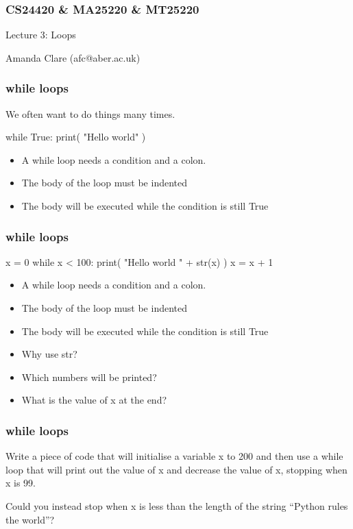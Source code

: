 \documentclass{beamer}
\begin{document}

\begin{frame}
\frametitle{CS24420 \& MA25220 \& MT25220}

\begin{center}
\begin{huge}
Lecture 3: Loops
\end{huge}
\bigskip

Amanda Clare (afc@aber.ac.uk)

\end{center}
\end{frame}


\begin{frame}[fragile]
\frametitle{while loops}
We often want to do things many times.
\begin{code}
while True:
   print( "Hello world" )
\end{code}
\begin{itemize}
\item A while loop needs a condition and a colon.
\item The body of the loop must be indented
\item The body will be executed while the condition is still True
\end{itemize}
\end{frame}


\begin{frame}[fragile]
\frametitle{while loops}
\begin{code}
x = 0
while x < 100:
   print( "Hello world " + str(x) )
   x = x + 1
\end{code}
\begin{itemize}
\item A while loop needs a condition and a colon.
\item The body of the loop must be indented
\item The body will be executed while the condition is still True
\item Why use str?
\item Which numbers will be printed?
\item What is the value of x at the end?
\end{itemize}
\end{frame}

\begin{frame}[fragile]
\frametitle{while loops}
Write a piece of code that will initialise a variable x to 200
and then use a while loop that will print out the value of x
and decrease the value of x, stopping when x is 99.

\bigskip

Could you instead stop when x is less than the length of
the string “Python rules the world”?
\end{frame}
\end{document}
